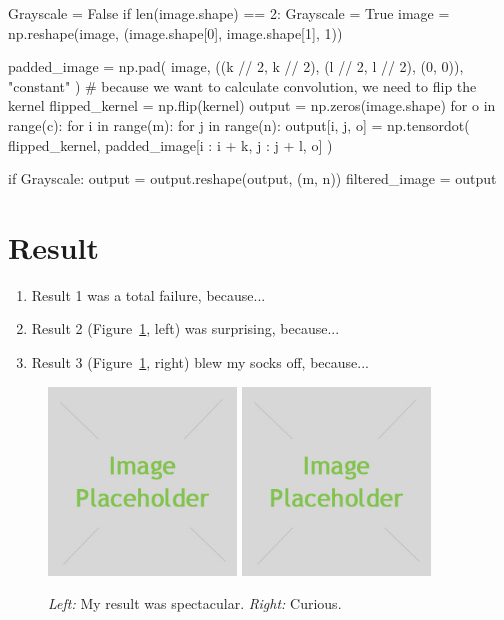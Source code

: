     Grayscale = False
    if len(image.shape) == 2:
        Grayscale = True
        image = np.reshape(image, (image.shape[0], image.shape[1], 1))

    padded_image = np.pad(
        image, ((k // 2, k // 2), (l // 2, l // 2), (0, 0)), "constant"
    )
    # because we want to calculate convolution, we need to flip the kernel
    flipped_kernel = np.flip(kernel)
    output = np.zeros(image.shape)
    for o in range(c):
        for i in range(m):
            for j in range(n):
                output[i, j, o] = np.tensordot(
                    flipped_kernel, padded_image[i : i + k, j : j + l, o]
                )

    if Grayscale:
        output = output.reshape(output, (m, n))
    filtered_image = output
\section*{Result}

\begin{enumerate}
    \item Result 1 was a total failure, because...
    \item Result 2 (Figure~\ref{fig:result1}, left) was surprising, because...
    \item Result 3 (Figure~\ref{fig:result1}, right) blew my socks off, because...
\end{enumerate}

\begin{figure}[h]
    \centering
    \includegraphics[width=5cm]{placeholder.jpg}
    \includegraphics[width=5cm]{placeholder.jpg}
    \caption{\emph{Left:} My result was spectacular. \emph{Right:} Curious.}
    \label{fig:result1}
\end{figure}

